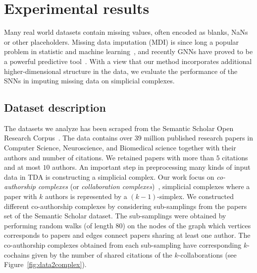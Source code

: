 \section{Experimental results}
Many real world datasets contain missing values, often encoded as blanks, NaNs or other placeholders. Missing data imputation (MDI) is since long a popular problem in statistic and machine learning~\cite{little1986statistical, nelwamondo2007missing}, and recently GNNs have proved to be a powerful predictive tool~\cite{spinelli2020neural}. With a view that our method incorporates additional higher-dimensional structure in the data, we evaluate the performance of the SNNs in imputing missing data on simplicial complexes.

\subsection{Dataset description}
The datasets we analyze has been scraped from the Semantic Scholar Open Research Corpus~\cite{ammar18NAACL}. The data contains over 39 million published research papers in Computer Science, Neuroscience, and Biomedical science together with their authors and number of citations. We retained papers with more than $5$ citations and at most $10$ authors. An important step in preprocessing many kinds of input data in TDA is constructing a simplicial complex. Our work focus on \emph{co-authorship complexes} (or \emph{collaboration complexes})~\cite{patania2017}, simplicial complexes where a paper with $k$ authors is represented by a $(k-1)$-simplex. We constructed different co-authorship complexes by considering sub-samplings from the papers set of the Semantic Scholar dataset. The sub-samplings were obtained by performing random walks (of length $80$) on the nodes of the graph which vertices corresponds to papers and edges connect papers sharing at least one author. The co-authorship complexes obtained from each sub-sampling have corresponding $k$-cochains given by the number of shared citations of the $k$-collaborations (see Figure~\ref{fig:data2complex}).

